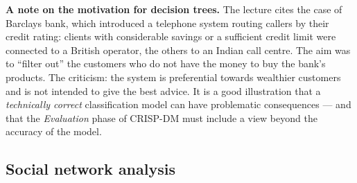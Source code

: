 \documentclass[11pt,a4paper]{article}
\theoremstyle{definition}
\providecommand{\uv}[1]{``#1''}
\begin{document}
\textbf{A note on the motivation for decision trees.} The lecture cites the case of Barclays bank,
which introduced a telephone system routing callers by their credit rating: clients with considerable
savings or a sufficient credit limit were connected to a British operator, the others to an Indian
call centre. The aim was to \uv{filter out} the customers who do not have the money to buy the bank's
products. The criticism: the system is preferential towards wealthier customers and is not intended
to give the best advice. It is a good illustration that a \emph{technically correct} classification
model can have problematic consequences --- and that the \emph{Evaluation} phase of CRISP-DM must
include a view beyond the accuracy of the model.

\subsection{Social network analysis}
\end{document}

